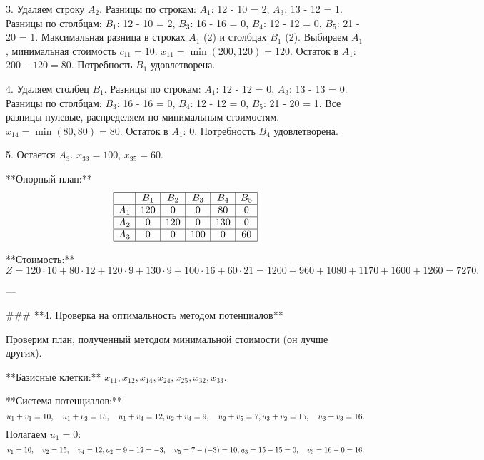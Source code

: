 3. Удаляем строку \( A_2 \).  
   Разницы по строкам:  
   \( A_1 \): 12 - 10 = 2,  
   \( A_3 \): 13 - 12 = 1.  
   Разницы по столбцам:  
   \( B_1 \): 12 - 10 = 2,  
   \( B_3 \): 16 - 16 = 0,  
   \( B_4 \): 12 - 12 = 0,  
   \( B_5 \): 21 - 20 = 1.  
   Максимальная разница в строках \( A_1 \) (2) и столбцах \( B_1 \) (2). Выбираем \( A_1 \), минимальная стоимость \( c_{11} = 10 \).  
   \( x_{11} = \min(200, 120) = 120 \).  
   Остаток в \( A_1 \): \( 200 - 120 = 80 \).  
   Потребность \( B_1 \) удовлетворена.  

4. Удаляем столбец \( B_1 \).  
   Разницы по строкам:  
   \( A_1 \): 12 - 12 = 0,  
   \( A_3 \): 13 - 13 = 0.  
   Разницы по столбцам:  
   \( B_3 \): 16 - 16 = 0,  
   \( B_4 \): 12 - 12 = 0,  
   \( B_5 \): 21 - 20 = 1.  
   Все разницы нулевые, распределяем по минимальным стоимостям.  
   \( x_{14} = \min(80, 80) = 80 \).  
   Остаток в \( A_1 \): 0.  
   Потребность \( B_4 \) удовлетворена.  

5. Остается \( A_3 \).  
   \( x_{33} = 100 \), \( x_{35} = 60 \).  

**Опорный план:**  
\[
\begin{array}{|c|c|c|c|c|c|}
\hline
 & B_1 & B_2 & B_3 & B_4 & B_5 \\
\hline
A_1 & 120 & 0 & 0 & 80 & 0 \\
\hline
A_2 & 0 & 120 & 0 & 130 & 0 \\
\hline
A_3 & 0 & 0 & 100 & 0 & 60 \\
\hline
\end{array}
\]

**Стоимость:**  
\[
Z = 120 \cdot 10 + 80 \cdot 12 + 120 \cdot 9 + 130 \cdot 9 + 100 \cdot 16 + 60 \cdot 21 = 1200 + 960 + 1080 + 1170 + 1600 + 1260 = 7270.
\]

---

### **4. Проверка на оптимальность методом потенциалов**

Проверим план, полученный методом минимальной стоимости (он лучше других).  

**Базисные клетки:**  
\( x_{11}, x_{12}, x_{14}, x_{24}, x_{25}, x_{32}, x_{33} \).  

**Система потенциалов:**  
\[
u_1 + v_1 = 10, \quad u_1 + v_2 = 15, \quad u_1 + v_4 = 12, \\
u_2 + v_4 = 9, \quad u_2 + v_5 = 7, \\
u_3 + v_2 = 15, \quad u_3 + v_3 = 16.
\]  
Полагаем \( u_1 = 0 \):  
\[
v_1 = 10, \quad v_2 = 15, \quad v_4 = 12, \\
u_2 = 9 - 12 = -3, \quad v_5 = 7 - (-3) = 10, \\
u_3 = 15 - 15 = 0, \quad v_3 = 16 - 0 = 16.
\]  

